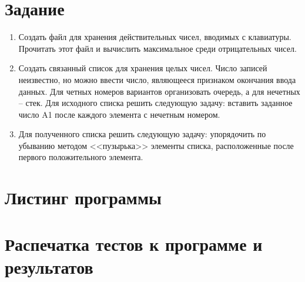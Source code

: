

\renewcommand{\labnumber}{5}
\renewcommand{\tasks}{(5, 12, 2)}



\maketitle
\thispagestyle{empty}
\newpage
{}
\tableofcontents

\newpage
\section{Задание}
\begin{enumerate}
    \item Создать  файл для хранения действительных чисел, вводимых с
        клавиатуры. Прочитать этот файл и вычислить максимальное
        среди отрицательных чисел.
    \item Создать связанный список для хранения целых чисел. Число
        записей неизвестно, но можно ввести число, являющееся
        признаком окончания ввода данных. Для четных номеров
        вариантов организовать очередь, а для нечетных – стек. Для
        исходного списка решить следующую задачу: вставить заданное
        число A1 после каждого элемента с нечетным номером.
    \item Для полученного списка решить следующую задачу: упорядочить
        по убыванию методом <<пузырька>> элементы списка,
        расположенные после первого положительного элемента.
\end{enumerate}

\newpage
\section{Листинг программы}




\newpage
\section{Распечатка тестов к программе и результатов}

